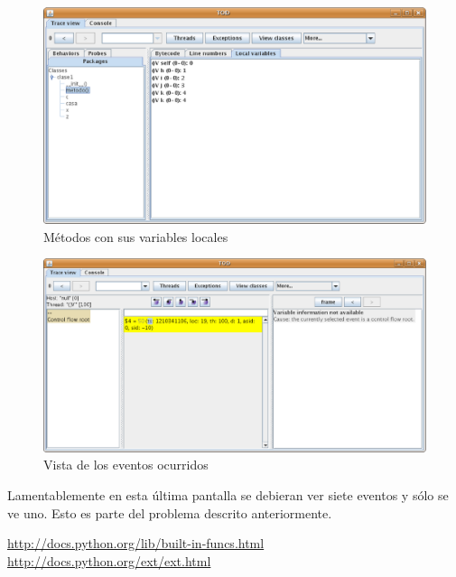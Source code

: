 \documentclass[10pt,a4paper]{article}
\begin{document}
\begin{figure}[hpb]
	\centering
	\includegraphics[scale=0.5]{images/TOD-4.eps}
	\caption{Métodos con sus variables locales}
\end{figure}

\newpage
\begin{figure}[hpb]
	\centering
	\includegraphics[scale=0.4]{images/TOD-5.eps}
	\caption{Vista de los eventos ocurridos}
\end{figure}

Lamentablemente en esta última pantalla se debieran ver siete eventos y sólo se ve uno.  Esto es parte del problema descrito anteriormente.

\newpage
\begin{thebibliography}{2}
 \url{http://docs.python.org/lib/built-in-funcs.html}
 \url{http://docs.python.org/ext/ext.html}
\end{thebibliography}
\end{document}

